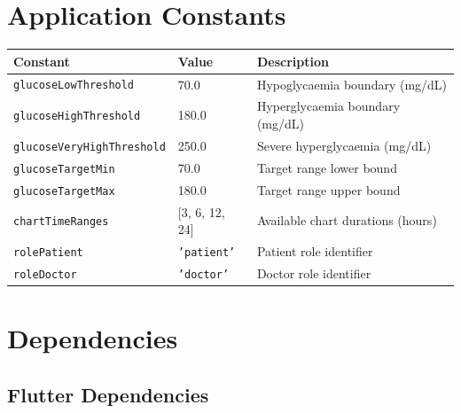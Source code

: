 \documentclass[12pt,a4paper]{article}
\begin{document}
\section{Application Constants}

\begin{longtable}{p{5.5cm} p{3cm} p{5.5cm}}
\toprule
\textbf{Constant} & \textbf{Value} & \textbf{Description} \\
\midrule
\endhead
\texttt{glucoseLowThreshold} & 70.0 & Hypoglycaemia boundary (mg/dL) \\
\texttt{glucoseHighThreshold} & 180.0 & Hyperglycaemia boundary (mg/dL) \\
\texttt{glucoseVeryHighThreshold} & 250.0 & Severe hyperglycaemia (mg/dL) \\
\texttt{glucoseTargetMin} & 70.0 & Target range lower bound \\
\texttt{glucoseTargetMax} & 180.0 & Target range upper bound \\
\texttt{chartTimeRanges} & [3, 6, 12, 24] & Available chart durations (hours) \\
\texttt{rolePatient} & \texttt{'patient'} & Patient role identifier \\
\texttt{roleDoctor} & \texttt{'doctor'} & Doctor role identifier \\
\bottomrule
\end{longtable}

\section{Dependencies}

\subsection{Flutter Dependencies}
\end{document}
